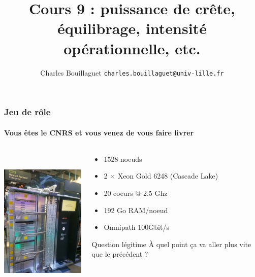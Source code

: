 \documentclass[xcolor={x11names,svgnames}, 14pt]{beamer}
\author[C.~Bouillaguet]{Charles Bouillaguet \newline
  {\small \texttt{charles.bouillaguet@univ-lille.fr}}}
\title{Cours 9 : puissance de crête, équilibrage, intensité opérationnelle, etc.}
\begin{document}
\begin{frame}[label=title]
    \titlepage
  \end{frame}
  

\begin{frame}
  \frametitle{Jeu de rôle}
  \framesubtitle{Vous êtes le CNRS et vous venez de vous faire livrer}
  \centering
  \begin{columns}
    \begin{column}{4.75cm}
      \includegraphics[height=7cm]{jean-zay}
    \end{column}
    \begin{column}{5.5cm}
      \small
      \begin{itemize}
      \item 1528 noeuds
      \item 2 $\times$ Xeon Gold 6248 (\og Cascade Lake\fg{})
      \item 20 coeurs @ 2.5 Ghz
      \item 192 Go RAM/noeud
      \item Omnipath 100Gbit/s
      \end{itemize}

      \begin{block}{Question légitime}
        À quel point ça va aller plus vite que le précédent ?
      \end{block}
    \end{column}
  \end{columns}
\end{frame}

\end{document}
